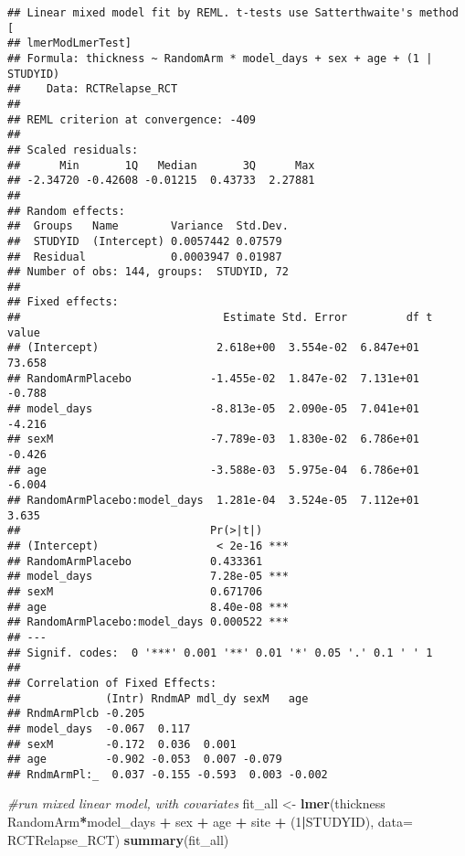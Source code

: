 \documentclass[]{article}
\newenvironment{Shaded}{\begin{snugshade}}{\end{snugshade}}
\newcommand{\KeywordTok}[1]{\textcolor[rgb]{0.13,0.29,0.53}{\textbf{#1}}}
\newcommand{\DataTypeTok}[1]{\textcolor[rgb]{0.13,0.29,0.53}{#1}}
\newcommand{\DecValTok}[1]{\textcolor[rgb]{0.00,0.00,0.81}{#1}}
\newcommand{\StringTok}[1]{\textcolor[rgb]{0.31,0.60,0.02}{#1}}
\newcommand{\CommentTok}[1]{\textcolor[rgb]{0.56,0.35,0.01}{\textit{#1}}}
\newcommand{\OperatorTok}[1]{\textcolor[rgb]{0.81,0.36,0.00}{\textbf{#1}}}
\newcommand{\NormalTok}[1]{#1}
\theoremstyle{definition}
\theoremstyle{definition}
\theoremstyle{definition}
\theoremstyle{remark}
\begin{document}
\begin{verbatim}
## Linear mixed model fit by REML. t-tests use Satterthwaite's method [
## lmerModLmerTest]
## Formula: thickness ~ RandomArm * model_days + sex + age + (1 | STUDYID)
##    Data: RCTRelapse_RCT
## 
## REML criterion at convergence: -409
## 
## Scaled residuals: 
##      Min       1Q   Median       3Q      Max 
## -2.34720 -0.42608 -0.01215  0.43733  2.27881 
## 
## Random effects:
##  Groups   Name        Variance  Std.Dev.
##  STUDYID  (Intercept) 0.0057442 0.07579 
##  Residual             0.0003947 0.01987 
## Number of obs: 144, groups:  STUDYID, 72
## 
## Fixed effects:
##                               Estimate Std. Error         df t value
## (Intercept)                  2.618e+00  3.554e-02  6.847e+01  73.658
## RandomArmPlacebo            -1.455e-02  1.847e-02  7.131e+01  -0.788
## model_days                  -8.813e-05  2.090e-05  7.041e+01  -4.216
## sexM                        -7.789e-03  1.830e-02  6.786e+01  -0.426
## age                         -3.588e-03  5.975e-04  6.786e+01  -6.004
## RandomArmPlacebo:model_days  1.281e-04  3.524e-05  7.112e+01   3.635
##                             Pr(>|t|)    
## (Intercept)                  < 2e-16 ***
## RandomArmPlacebo            0.433361    
## model_days                  7.28e-05 ***
## sexM                        0.671706    
## age                         8.40e-08 ***
## RandomArmPlacebo:model_days 0.000522 ***
## ---
## Signif. codes:  0 '***' 0.001 '**' 0.01 '*' 0.05 '.' 0.1 ' ' 1
## 
## Correlation of Fixed Effects:
##             (Intr) RndmAP mdl_dy sexM   age   
## RndmArmPlcb -0.205                            
## model_days  -0.067  0.117                     
## sexM        -0.172  0.036  0.001              
## age         -0.902 -0.053  0.007 -0.079       
## RndmArmPl:_  0.037 -0.155 -0.593  0.003 -0.002
\end{verbatim}

\begin{Shaded}
\begin{Highlighting}[]
\CommentTok{#run mixed linear model, with covariates}
\NormalTok{  fit_all <-}\StringTok{ }\KeywordTok{lmer}\NormalTok{(thickness }\OperatorTok{~}\StringTok{ }\NormalTok{RandomArm}\OperatorTok{*}\NormalTok{model_days }\OperatorTok{+}\StringTok{ }\NormalTok{sex }\OperatorTok{+}\StringTok{ }\NormalTok{age }\OperatorTok{+}\StringTok{ }\NormalTok{site }\OperatorTok{+}\StringTok{ }\NormalTok{(}\DecValTok{1}\OperatorTok{|}\NormalTok{STUDYID), }\DataTypeTok{data=}\NormalTok{ RCTRelapse_RCT)}
  \KeywordTok{summary}\NormalTok{(fit_all)}
\end{Highlighting}
\end{Shaded}
\end{document}
